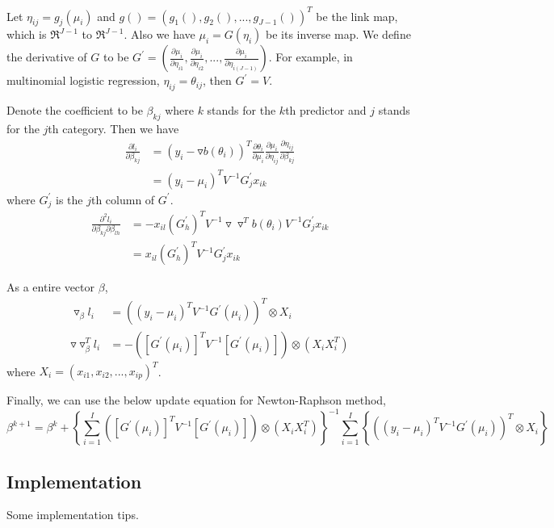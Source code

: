 Let $\eta_{ij} = g_j(\mu_i)$ and $g() = (g_1(), g_2(), ..., g_{J-1}())^T$ be the link map, which is $\Re^{J-1}$ to $\Re^{J-1}$. Also we have $\mu_i = G(\eta_i)$ be its inverse map. We define the derivative of $G$ to be $G^\prime = \left(\frac{\partial\mu_i}{\partial\eta_{i1}}, \frac{\partial\mu_i}{\partial\eta_{i2}}, ..., \frac{\partial\mu_i}{\partial\eta_{i(J-1)}} \right)$. For example, in multinomial logistic regression, $\eta_{ij} = \theta_{ij}$, then $G^\prime = V$.

Denote the coefficient to be $\beta_{kj}$ where $k$ stands for the $k$th predictor and $j$ stands for the $j$th category. Then we have
\begin{align*}
\frac{\partial l_i}{\partial \beta_{kj}} & = (y_i - \triangledown b(\theta_i) )^T \frac{\partial \theta_i}{\partial \mu_i} \frac{\partial \mu_i}{\partial \eta_{ij}} \frac{\partial \eta_{ij}}{\partial \beta_{kj}} \\
& = (y_i - \mu_i )^T V^{-1} G^\prime_j x_{ik}
\end{align*}
where $G^\prime_j$ is the $j$th column of $G^\prime$.
\begin{align*}
\frac{\partial^2 l_i}{\partial\beta_{kj} \partial\beta_{lh}} &= -x_{il} (G^\prime_h)^T V^{-1} \triangledown \triangledown^T b(\theta_i) V^{-1} G^\prime_j x_{ik} \\
& = x_{il} (G^\prime_h)^T V^{-1} G^\prime_j x_{ik}
\end{align*}

As a entire vector $\beta$,
\begin{align*}
\triangledown_\beta l_i &= \left((y_i - \mu_i)^T V^{-1} G^\prime(\mu_i) \right)^T \otimes X_i \\
\triangledown \triangledown^T_\beta l_i & = - \left( [G^\prime(\mu_i)]^T V^{-1} [G^\prime(\mu_i)] \right) \otimes (X_i X_i^T)
\end{align*}
where $X_i = (x_{i1}, x_{i2}, ... , x_{ip})^T$.

Finally, we can use the below update equation for Newton-Raphson method,
\[
\beta^{k+1} = \beta^k + \left\{ \sum_{i=1}^I\left([G^\prime(\mu_i)]^T V^{-1} [G^\prime(\mu_i)] \right) \otimes (X_i X_i^T)\right\}^{-1}\sum_{i=1}^I\left\{\left((y_i - \mu_i)^T V^{-1} G^\prime(\mu_i) \right)^T \otimes X_i\right\}
\]

\subsection{Implementation}
Some implementation tips.


